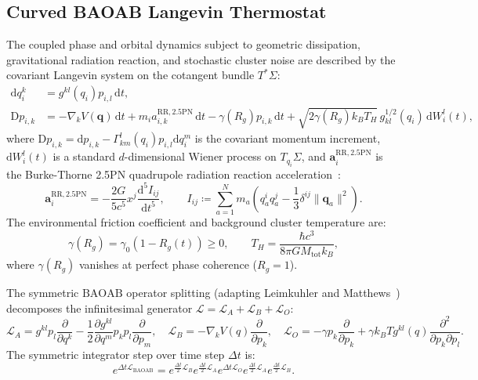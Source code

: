 \documentclass[11pt,a4paper,reqno]{article}
\theoremstyle{plain}
\theoremstyle{definition}
\theoremstyle{remark}
\numberwithin{equation}{section}
\begin{document}
\subsection{Curved BAOAB Langevin Thermostat}
The coupled phase and orbital dynamics subject to geometric dissipation, gravitational radiation reaction, and stochastic cluster noise are described by the covariant Langevin system on the cotangent bundle $T^*\Sigma$:
\begin{align}
\mathrm{d}q_i^k &= g^{kl}(q_i) p_{i, l} \, \mathrm{d}t, \label{eq:langevin_q} \\
\mathrm{D}p_{i, k} &= -\nabla_k V(\bm{q}) \, \mathrm{d}t + m_i a_{i, k}^{\mathrm{RR}, 2.5\mathrm{PN}} \, \mathrm{d}t - \gamma(R_g) p_{i, k} \, \mathrm{d}t + \sqrt{2 \gamma(R_g) k_B T_H} \, g_{kl}^{1/2}(q_i) \, \mathrm{d}W_i^l(t), \label{eq:langevin_p}
\end{align}
where $\mathrm{D}p_{i, k} = \mathrm{d}p_{i, k} - \Gamma_{km}^l(q_i) p_{i, l} \mathrm{d}q_i^m$ is the covariant momentum increment, $\mathrm{d}W_i^l(t)$ is a standard $d$-dimensional Wiener process on $T_{q_i}\Sigma$, and $\bm{a}_i^{\mathrm{RR}, 2.5\mathrm{PN}}$ is the Burke-Thorne 2.5PN quadrupole radiation reaction acceleration~\cite{BurkeThorne1970}:
\begin{equation}
\bm{a}_i^{\mathrm{RR}, 2.5\mathrm{PN}} = -\frac{2 G}{5 c^5} x^j \frac{\mathrm{d}^5 I_{ij}}{\mathrm{d}t^5}, \qquad I_{ij} \coloneqq \sum_{a=1}^N m_a \left( q_a^i q_a^j - \frac{1}{3} \delta^{ij} \|\bm{q}_a\|^2 \right).
\end{equation}
The environmental friction coefficient and background cluster temperature are:
\begin{equation}
\gamma(R_g) = \gamma_0 \left(1 - R_g(t)\right) \ge 0, \qquad T_H = \frac{\hbar c^3}{8\pi G M_{\text{tot}} k_B},
\end{equation}
where $\gamma(R_g)$ vanishes at perfect phase coherence ($R_g = 1$).

The symmetric $\mathrm{BAOAB}$ operator splitting (adapting Leimkuhler and Matthews~\cite{LeimkuhlerMatthews2013}) decomposes the infinitesimal generator $\mathcal{L} = \mathcal{L}_A + \mathcal{L}_B + \mathcal{L}_O$:
\begin{equation}
\mathcal{L}_A = g^{kl} p_l \frac{\partial}{\partial q^k} - \frac{1}{2} \frac{\partial g^{kl}}{\partial q^m} p_k p_l \frac{\partial}{\partial p_m}, \quad \mathcal{L}_B = -\nabla_k V(q) \frac{\partial}{\partial p_k}, \quad \mathcal{L}_O = -\gamma p_k \frac{\partial}{\partial p_k} + \gamma k_B T g^{kl}(q) \frac{\partial^2}{\partial p_k \partial p_l}.
\end{equation}
The symmetric integrator step over time step $\Delta t$ is:
\begin{equation}
e^{\Delta t \mathcal{L}_{\mathrm{BAOAB}}} = e^{\frac{\Delta t}{2} \mathcal{L}_B} e^{\frac{\Delta t}{2} \mathcal{L}_A} e^{\Delta t \mathcal{L}_O} e^{\frac{\Delta t}{2} \mathcal{L}_A} e^{\frac{\Delta t}{2} \mathcal{L}_B}.
\label{eq:baoab_split}
\end{equation}
\end{document}
